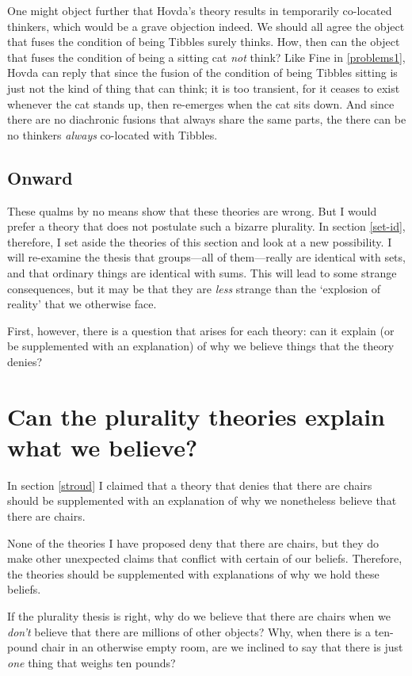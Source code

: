 \documentclass[11pt]{article}
\begin{document}
\begin{spacing}{1.5}
One might object further that Hovda's theory results in temporarily
co-located thinkers, which would be a grave objection indeed.  We
should all agree the object that fuses the condition of being Tibbles
surely thinks.  How, then can the object that fuses the condition of
being a sitting cat {\em not} think?  Like Fine in \ref{problems1},
Hovda can reply that since the fusion of the condition of being
Tibbles sitting is just not the kind of thing that can think; it is
too transient, for it ceases to exist whenever the cat stands up, then
re-emerges when the cat sits down.  And since there are no diachronic
fusions that always share the same parts, the there can be no thinkers
{\em always} co-located with Tibbles.

\subsection{Onward}
\label{hovda-o}
These qualms by no means show that these theories are wrong.  But I
would prefer a theory that does not postulate such a bizarre
plurality.  In section \ref{set-id}, therefore, I set aside the
theories of this section and look at a new possibility.  I will
re-examine the thesis that groups---all of them---really are identical
with sets, and that ordinary things are identical with sums.  This
will lead to some strange consequences, but it may be that they are
{\em less} strange than the `explosion of reality' that we otherwise
face.

First, however, there is a question that arises for each theory: can
it explain (or be supplemented with an explanation) of why we believe
things that the theory denies?

\section{Can the plurality theories explain what we believe?}
\label{explain-p}
In section \ref{stroud} I claimed that a theory that denies that there
are chairs should be supplemented with an explanation of why we
nonetheless believe that there are chairs.

None of the theories I have proposed deny that there are chairs, but
they do make other unexpected claims that conflict with certain of our
beliefs.  Therefore, the theories should be supplemented with
explanations of why we hold these beliefs.

If the plurality thesis is right, why do we believe that there are
chairs when we {\em don't} believe that there are millions of other
objects?  Why, when there is a ten-pound chair in an otherwise empty
room, are we inclined to say that there is just {\em one} thing that
weighs ten pounds?


\end{spacing}
\end{document}
